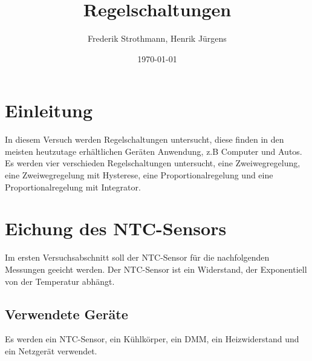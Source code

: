 \documentclass[12pt,a4paper]{article}
\title{Regelschaltungen}
\author{Frederik Strothmann, Henrik Jürgens}
\date{\today}
\begin{document}
\maketitle
\newpage
\tableofcontents
\newpage
\section{Einleitung}

In diesem Versuch werden Regelschaltungen untersucht, diese finden in den meisten heutzutage erhältlichen Geräten Anwendung, z.B Computer und Autos. Es werden vier verschieden Regelschaltungen untersucht, eine Zweiwegregelung, eine Zweiwegregelung mit Hysterese, eine Proportionalregelung und eine Proportionalregelung mit Integrator.


\section{Eichung des NTC-Sensors}
Im ersten Versuchsabschnitt soll der NTC-Sensor für die nachfolgenden Messungen geeicht werden. Der NTC-Sensor ist ein Widerstand, der Exponentiell von der Temperatur abhängt.

\subsection{Verwendete Geräte}

Es werden ein NTC-Sensor, ein Kühlkörper, ein DMM, ein Heizwiderstand und ein Netzgerät verwendet.
\end{document}
